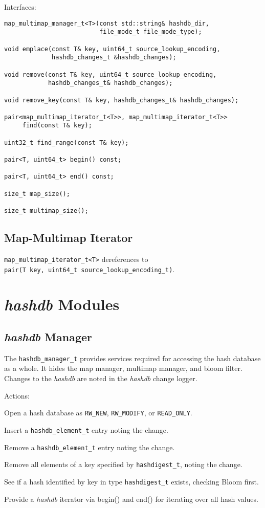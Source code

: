 \documentclass[12pt,twoside]{article}
\newcommand{\hdb}{\emph{hashdb}\xspace}
\begin{document}
Interfaces:

\begin{small}
\begin{verbatim}
map_multimap_manager_t<T>(const std::string& hashdb_dir,
                          file_mode_t file_mode_type);

void emplace(const T& key, uint64_t source_lookup_encoding,
             hashdb_changes_t &hashdb_changes);

void remove(const T& key, uint64_t source_lookup_encoding,
            hashdb_changes_t& hashdb_changes);

void remove_key(const T& key, hashdb_changes_t& hashdb_changes);

pair<map_multimap_iterator_t<T>>, map_multimap_iterator_t<T>>
     find(const T& key);

uint32_t find_range(const T& key);

pair<T, uint64_t> begin() const;

pair<T, uint64_t> end() const;

size_t map_size();

size_t multimap_size();
\end{verbatim}
\end{small}

\subsection{Map-Multimap Iterator}
\texttt{map\_multimap\_iterator\_t<T>} dereferences to \\
\texttt{pair(T key, uint64\_t source\_lookup\_encoding\_t)}.

\section{\hdb Modules}
\subsection{\hdb Manager}
The \texttt{hashdb\_manager\_t}
provides services required for accessing the hash database
as a whole.  It hides the map manager, multimap manager, and bloom filter.
Changes to the \hdb are noted in the \hdb change logger.

Actions:
\begin{compactitem}
\item Open a hash database as
\texttt{RW\_NEW}, \texttt{RW\_MODIFY}, or \texttt{READ\_ONLY}.
\item Insert a \texttt{hashdb\_element\_t} entry noting the change.
\item Remove a \texttt{hashdb\_element\_t} entry noting the change.
\item Remove all elements of a key
specified by \texttt{hashdigest\_t}, noting the change.
\item See if a hash identified by key in
type \texttt{hashdigest\_t} exists, checking Bloom first.
\item Provide a \hdb iterator via begin() and end()
for iterating over all hash values.
\end{compactitem}
\end{document}
